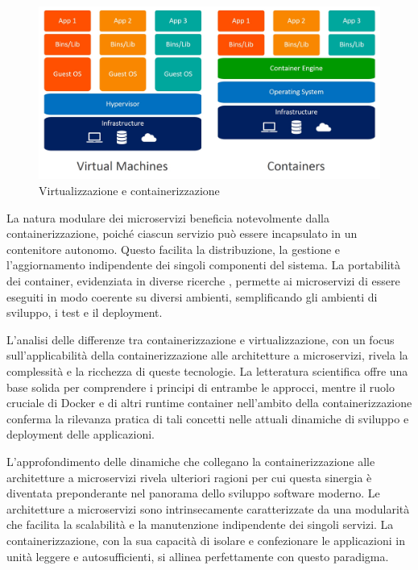 \begin{figure}[h]
    \centering
    \includegraphics[width=\linewidth]{figures/ch3/containers-vs-virtualization.jpg}
    \caption[Virtualizzazione e containerizzazione]{Virtualizzazione e containerizzazione}
    \label{fig:cha3:containers}
\end{figure}

La natura modulare dei microservizi beneficia notevolmente dalla containerizzazione, poiché ciascun servizio può essere incapsulato in un contenitore autonomo. Questo facilita la distribuzione, la gestione e l'aggiornamento indipendente dei singoli componenti del sistema. La portabilità dei container, evidenziata in diverse ricerche \cite{merkel2014docker}, permette ai microservizi di essere eseguiti in modo coerente su diversi ambienti, semplificando gli ambienti di sviluppo, i test e il deployment.

L'analisi delle differenze tra containerizzazione e virtualizzazione, con un focus sull'applicabilità della containerizzazione alle architetture a microservizi, rivela la complessità e la ricchezza di queste tecnologie. La letteratura scientifica offre una base solida per comprendere i principi di entrambe le approcci, mentre il ruolo cruciale di Docker e di altri runtime container nell'ambito della containerizzazione conferma la rilevanza pratica di tali concetti nelle attuali dinamiche di sviluppo e deployment delle applicazioni.

L'approfondimento delle dinamiche che collegano la containerizzazione alle architetture a microservizi rivela ulteriori ragioni per cui questa sinergia è diventata preponderante nel panorama dello sviluppo software moderno. Le architetture a microservizi sono intrinsecamente caratterizzate da una modularità che facilita la scalabilità e la manutenzione indipendente dei singoli servizi. La containerizzazione, con la sua capacità di isolare e confezionare le applicazioni in unità leggere e autosufficienti, si allinea perfettamente con questo paradigma.

